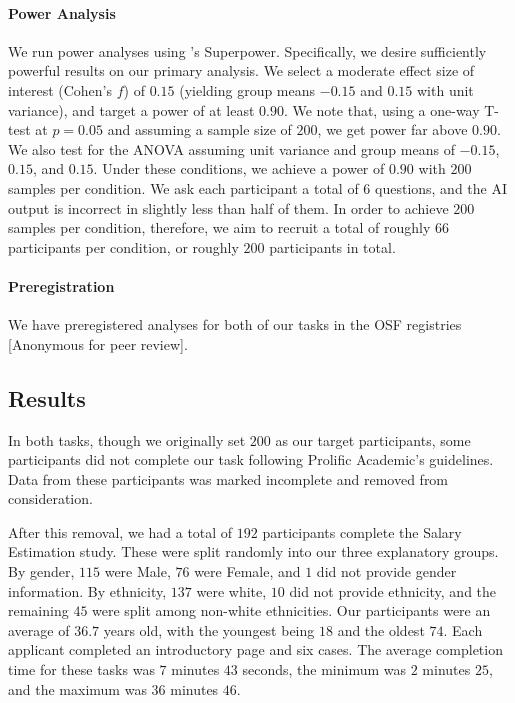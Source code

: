 \paragraph{Power Analysis}
We run power analyses using \textcite{Caldwell-et-al}'s Superpower. Specifically, we desire sufficiently powerful results on our primary analysis. We select a moderate effect size of interest (Cohen’s $f$) of $0.15$ (yielding group means $-0.15$ and $0.15$ with unit variance), and target a power of at least $0.90$. We note that, using a one-way T-test at $p = 0.05$ and assuming a sample size of $200$, we get power far above $0.90$. We also test for the ANOVA assuming unit variance and group means of $-0.15$, $0.15$, and $0.15$. Under these conditions, we achieve a power of $0.90$ with $200$ samples per condition. We ask each participant a total of 6 questions, and the AI output is incorrect in slightly less than half of them. In order to achieve $200$ samples per condition, therefore, we aim to recruit a total of roughly $66$ participants per condition, or roughly $200$ participants in total.

\paragraph{Preregistration}
We have preregistered analyses for both of our tasks in the OSF registries [Anonymous for peer review]. 

\subsection{Results}\label{ssec:os_results}
In both tasks, though we originally set $200$ as our target participants, some participants did not complete our task following Prolific Academic's guidelines. Data from these participants was marked incomplete and removed from consideration. 

After this removal, we had a total of $192$ participants complete the Salary Estimation study. These were split randomly into our three explanatory groups. By gender, $115$ were Male, $76$ were Female, and $1$ did not provide gender information. By ethnicity, $137$ were white, $10$ did not provide ethnicity, and the remaining $45$ were split among non-white ethnicities. Our participants were an average of $36.7$ years old, with the youngest being $18$ and the oldest $74$. Each applicant completed an introductory page and six cases. The average completion time for these tasks was $7$ minutes $43$ seconds, the minimum was $2$ minutes $25$, and the maximum was $36$ minutes $46$.

